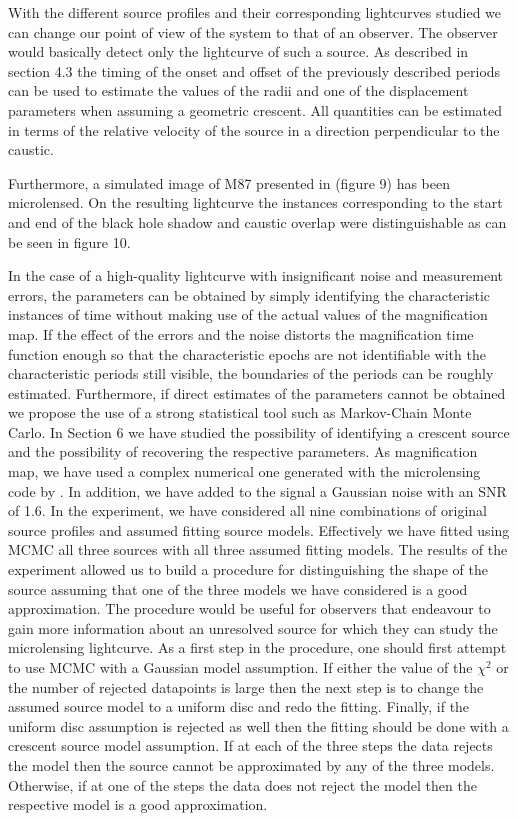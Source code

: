 \documentclass[usenatbib]{mn2e}
\begin{document}
With the different source profiles and their corresponding lightcurves studied we can change our point of view of the system to that of an observer. 
The observer would basically detect only the lightcurve of such a source. As described in section 4.3 the timing of the onset and offset of the previously 
described periods can be used to estimate the values of the radii and one of the displacement parameters when assuming a geometric crescent. 
All quantities can be estimated in terms of the relative velocity of the source in a direction perpendicular to the caustic.


Furthermore, a simulated image of M87 presented in \citep{2012MNRAS.421.1517D} (figure 9) has been microlensed. On the resulting lightcurve the instances 
corresponding to the start and end of the black hole shadow and caustic overlap were distinguishable as can be seen in figure 10.
    

In the case of a high-quality lightcurve with insignificant noise and measurement errors, the parameters can be obtained 
by simply identifying the characteristic instances of time without making use of the actual values of the magnification
 map. If the effect of the errors and the noise distorts the magnification time function enough so that the 
characteristic epochs are not identifiable with the characteristic periods still visible, the boundaries of the periods 
can be roughly estimated. Furthermore, if direct estimates of the parameters cannot be obtained we propose the use of a strong
statistical tool such as Markov-Chain Monte Carlo. In Section 6  we have studied the possibility of identifying a crescent 
source and  the possibility of recovering the respective parameters. As magnification map, we have used a complex numerical 
one generated with the microlensing code by \cite{1999A&A...346L...5W}. In addition, we have added to the signal a Gaussian 
noise with an SNR of 1.6.  In the experiment, we have considered all nine combinations of original source profiles and assumed fitting source models.
Effectively we have fitted using MCMC all three sources with all three assumed fitting models. The results of the experiment allowed us to build a 
procedure for distinguishing the shape of the source assuming that one of the three models we have considered is a good approximation.  
The procedure would be useful for observers that endeavour to gain more information about an unresolved source for which they can study 
the microlensing lightcurve.  As a first step in the procedure, one should first attempt to use MCMC with a Gaussian model assumption. 
If either the value of the $\chi^2$ or the number of rejected datapoints is large then the next step is to change the assumed source model to 
a uniform disc and redo the fitting. Finally, if the uniform disc assumption is rejected as well then the fitting should be done with a 
crescent source model assumption. If at each of the three steps the data rejects the model then the source cannot be approximated by any of the three models. 
Otherwise, if at one of the steps the data does not reject the model then the respective model is a good approximation.   
\end{document}
